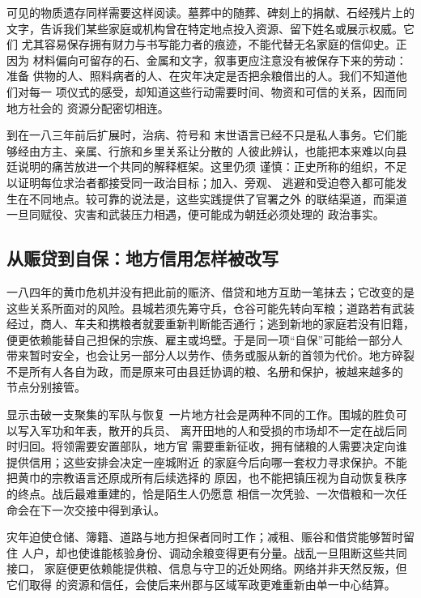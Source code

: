 可见的物质遗存同样需要这样阅读。墓葬中的随葬、碑刻上的捐献、石经残片上的
文字，告诉我们某些家庭或机构曾在特定地点投入资源、留下姓名或展示权威。它们
尤其容易保存拥有财力与书写能力者的痕迹，不能代替无名家庭的信仰史。正因为
材料偏向可留存的石、金属和文字，叙事更应注意没有被保存下来的劳动：准备
供物的人、照料病者的人、在灾年决定是否把余粮借出的人。我们不知道他们对每一
项仪式的感受，却知道这些行动需要时间、物资和可信的关系，因而同地方社会的
资源分配密切相连。

到在一八三年前后扩展时，治病、符号和
末世语言已经不只是私人事务。它们能够经由方主、亲属、行旅和乡里关系让分散的
人彼此辨认，也能把本来难以向县廷说明的痛苦放进一个共同的解释框架。这里仍须
谨慎：正史所称的组织，不足以证明每位求治者都接受同一政治目标；加入、旁观、
逃避和受迫卷入都可能发生在不同地点。较可靠的说法是，这些实践提供了官署之外
的联结渠道，而渠道一旦同赋役、灾害和武装压力相遇，便可能成为朝廷必须处理的
政治事实。

\subsection{从赈贷到自保：地方信用怎样被改写}

一八四年的黄巾危机并没有把此前的赈济、借贷和地方互助一笔抹去；它改变的是
这些关系所面对的风险。县城若须先筹守兵，仓谷可能先转向军粮；道路若有武装
经过，商人、车夫和携粮者就要重新判断能否通行；逃到新地的家庭若没有旧籍，
便更依赖能替自己担保的宗族、雇主或坞壁。于是同一项“自保”可能给一部分人
带来暂时安全，也会让另一部分人以劳作、债务或服从新的首领为代价。地方碎裂
不是所有人各自为政，而是原来可由县廷协调的粮、名册和保护，被越来越多的
节点分别接管。

显示击破一支聚集的军队与恢复
一片地方社会是两种不同的工作。围城的胜负可以写入军功和年表，散开的兵员、
离开田地的人和受损的市场却不一定在战后同时归回。将领需要安置部队，地方官
需要重新征收，拥有储粮的人需要决定向谁提供信用；这些安排会决定一座城附近
的家庭今后向哪一套权力寻求保护。不能把黄巾的宗教语言还原成所有后续选择的
原因，也不能把镇压视为自动恢复秩序的终点。战后最难重建的，恰是陌生人仍愿意
相信一次凭验、一次借粮和一次任命会在下一次交接中得到承认。

\begin{causalchain}[救助为何会进入地方权力的变化]
灾年迫使仓储、簿籍、道路与地方担保者同时工作；减租、赈谷和借贷能够暂时留住
人户，却也使谁能核验身份、调动余粮变得更有分量。战乱一旦阻断这些共同接口，
家庭便更依赖能提供粮、信息与守卫的近处网络。网络并非天然反叛，但它们取得
的资源和信任，会使后来州郡与区域军政更难重新由单一中心结算。
\end{causalchain}
